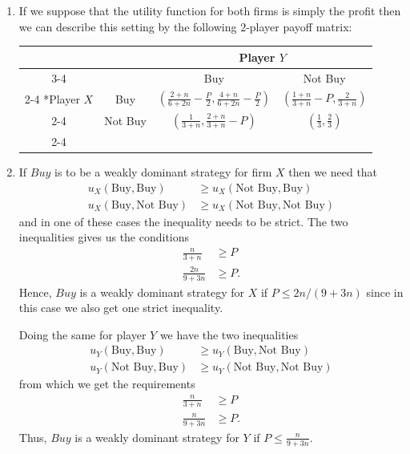 \documentclass[a4paper]{article}
\begin{document}
\begin{exercise}{5}
  \begin{enumerate}[label=(\alph*)]
    \item If we suppose that the utility function for both firms is simply the profit then we can describe this setting by the following $ 2 $-player payoff matrix:
      \begin{table}[H]
        \setlength{\extrarowheight}{2pt}
        \centering
        \begin{tabular}{*{4}{c|}}
          \multicolumn{2}{c}{} & \multicolumn{2}{c}{Player $Y$}\\\cline{3-4}
          \multicolumn{1}{c}{} &  & Buy  & Not Buy \\\cline{2-4}
          \multirow{2}*{Player $X$}  & Buy & $(\frac{2+n}{6 + 2n} - \frac{P}{2}, \frac{4+n}{6 + 2n} - \frac{P}{2})$ & $(\frac{1+n}{3+n} - P, \frac{2}{3 + n})$ \\\cline{2-4}
                                     & Not Buy & $(\frac{1}{3 + n}, \frac{2 + n}{3 + n} - P)$ & $(\frac{1}{3}, \frac{2}{3})$ \\\cline{2-4}
        \end{tabular}
      \end{table}

    \item If $ Buy $ is to be a weakly dominant strategy for firm $ X $ then we need that
      \begin{align*}
        u_X(\text{Buy}, \text{Buy}) &\geq u_X(\text{Not Buy}, \text{Buy}) \\
        u_X(\text{Buy}, \text{Not Buy}) &\geq u_X(\text{Not Buy}, \text{Not Buy})
      \end{align*}
      and in one of these cases the inequality needs to be strict. The two inequalities gives us the conditions
      \begin{align*}
        \frac{n}{3 + n} & \geq P \\
        \frac{2n}{9 + 3n} & \geq P.
      \end{align*}
      Hence, $ Buy $ is a weakly dominant strategy for $ X $ if $ P \leq 2n/(9+3n) $ since in this case we also get one strict inequality.

      Doing the same for player $ Y $ we have the two inequalities
      \begin{align*}
        u_Y(\text{Buy}, \text{Buy}) &\geq u_Y(\text{Buy}, \text{Not Buy}) \\
        u_Y(\text{Not Buy}, \text{Buy}) &\geq u_Y(\text{Not Buy}, \text{Not Buy})
      \end{align*}
      from which we get the requirements
      \begin{align*}
        \frac{n}{3+n} &\geq P \\
        \frac{n}{9+3n} &\geq P.
      \end{align*}
      Thus, $ Buy $ is a weakly dominant strategy for $ Y $ if $ P \leq \frac{n}{9+3n} $.


\end{enumerate}
\end{exercise}
\end{document}
